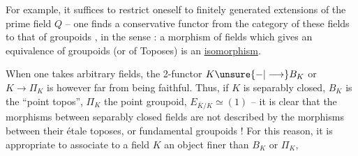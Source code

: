 For example, it suffices to restrict oneself to finitely generated extensions of the prime field $Q$ -- one finds a conservative functor from the category of these fields to that of groupoids , in the sense : a morphism of fields which gives an equivalence of groupoids (or of Toposes) is an \uline{isomorphism}.


When one takes arbitrary fields, the 2-functor $K\unsure{-|\longrightarrow}B_K$ or $K\longrightarrow\Pi_K$  is however far from being faithful. Thus, if $K$ is separably closed, $B_K$ is the ``point topos'', $\Pi_K$ the point groupoid, $E_{\bar K/K}\simeq(1)$ -- it is clear that the morphisms between separably closed fields are not described by the morphisms between their étale toposes, or fundamental groupoids ! For this reason, it is appropriate to associate to a field $K$ an object finer than $B_K$ or $\Pi_K$,
